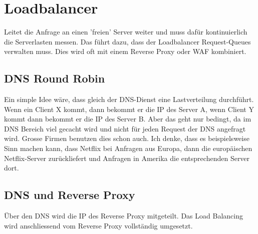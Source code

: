\section{Loadbalancer}
Leitet die Anfrage an einen 'freien' Server weiter und muss dafür kontinuierlich die Serverlasten messen. Das führt dazu, dass der Loadbalancer Request-Queues verwalten muss. Dies wird oft mit einem Reverse Proxy oder WAF kombiniert.

\subsection{DNS Round Robin}
Ein simple Idee wäre, dass gleich der DNS-Dienst eine Lastverteilung durchführt. Wenn ein Client X kommt, dann bekommt er die IP des Server A, wenn Client Y kommt dann bekommt er die IP des Server B. Aber das geht nur bedingt, da im DNS Bereich viel gecacht wird und nicht für jeden Request der DNS angefragt wird. Grosse Firmen benutzen dies schon auch. Ich denke, dass es beispielsweise Sinn machen kann, dass Netflix bei Anfragen aus Europa, dann die europäischen Netflix-Server zurückliefert und Anfragen in Amerika die entsprechenden Server dort.

\subsection{DNS und Reverse Proxy}
Über den DNS wird die IP des Reverse Proxy mitgeteilt. Das Load Balancing wird anschliessend vom Reverse Proxy vollständig umgesetzt.




